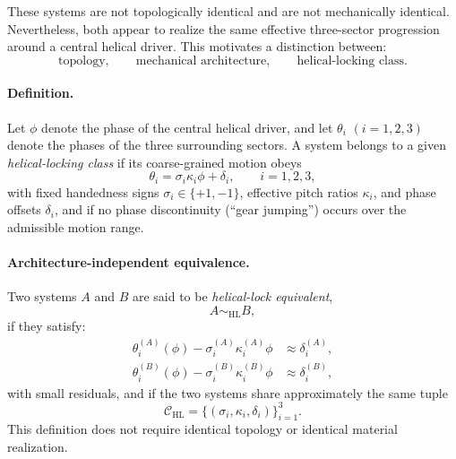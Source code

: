 \documentclass[11pt]{article}
\begin{document}
            These systems are not topologically identical and are not mechanically identical. Nevertheless, both appear to realize the same effective three-sector progression around a central helical driver. This motivates a distinction between:
            \begin{equation}
                \text{topology}, \qquad
                \text{mechanical architecture}, \qquad
                \text{helical-locking class}.
            \end{equation}
            
            \paragraph{Definition.}
                Let \(\phi\) denote the phase of the central helical driver, and let \(\theta_i\) \((i=1,2,3)\) denote the phases of the three surrounding sectors. A system belongs to a given \emph{helical-locking class} if its coarse-grained motion obeys
            \begin{equation}
                \theta_i = \sigma_i \kappa_i \phi + \delta_i,
                \qquad i=1,2,3,
                \label{eq:HL-law-arch}
                \end{equation}
                with fixed handedness signs \(\sigma_i\in\{+1,-1\}\), effective pitch ratios \(\kappa_i\), and phase offsets \(\delta_i\), and if no phase discontinuity (``gear jumping'') occurs over the admissible motion range.
            
            \paragraph{Architecture-independent equivalence.}
                Two systems \(A\) and \(B\) are said to be \emph{helical-lock equivalent},
            \begin{equation}
                A \sim_{\mathrm{HL}} B,
                \end{equation}
                if they satisfy:
            \begin{align}
                \theta_i^{(A)}(\phi) - \sigma_i^{(A)}\kappa_i^{(A)}\phi
                &\approx
                \delta_i^{(A)}, \\
                \theta_i^{(B)}(\phi) - \sigma_i^{(B)}\kappa_i^{(B)}\phi
                &\approx
                \delta_i^{(B)},
                \end{align}
                with small residuals, and if the two systems share approximately the same tuple
            \begin{equation}
                \mathcal{C}_{\mathrm{HL}}
                =
                \bigl\{(\sigma_i,\kappa_i,\delta_i)\bigr\}_{i=1}^{3}.
                \end{equation}
                This definition does not require identical topology or identical material realization.
            
\end{document}
